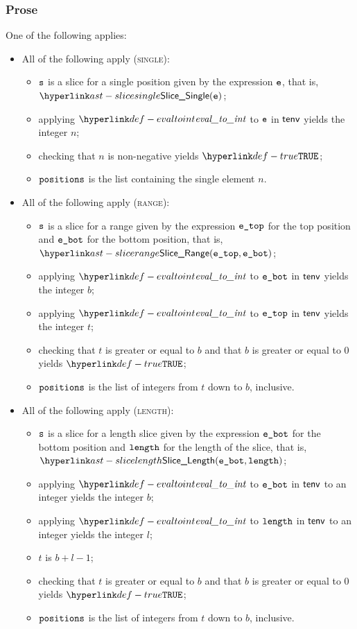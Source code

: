 \subsubsection{Prose}
One of the following applies:
\begin{itemize}
  \item All of the following apply (\textsc{single}):
  \begin{itemize}
    \item $\texttt{s}$ is a slice for a single position given by the expression $\texttt{e}$, that is, \\ $\SliceSingle(\ve)$;
    \item applying $\evaltoint$ to $\texttt{e}$ in $\textsf{tenv}$ yields the integer $n$\ProseOrTypeError;
    \item checking that $n$ is non-negative yields $\True$\ProseOrTypeError;
    \item $\texttt{positions}$ is the list containing the single element $n$.
  \end{itemize}

  \item All of the following apply (\textsc{range}):
  \begin{itemize}
    \item $\texttt{s}$ is a slice for a range given by the expression $\texttt{e\_top}$
          for the top position and $\texttt{e\_bot}$ for the bottom position, that is, \\ $\SliceRange(\etop, \ebot)$;
    \item applying $\evaltoint$ to $\texttt{e\_bot}$ in $\textsf{tenv}$ yields the integer $b$\ProseOrTypeError;
    \item applying $\evaltoint$ to $\texttt{e\_top}$ in $\textsf{tenv}$ yields the integer $t$\ProseOrTypeError;
    \item checking that $t$ is greater or equal to $b$ and that $b$ is greater or equal to $0$ yields $\True$\ProseOrTypeError;
    \item $\texttt{positions}$ is the list of integers from $t$ down to $b$, inclusive.
  \end{itemize}

  \item All of the following apply (\textsc{length}):
  \begin{itemize}
    \item $\texttt{s}$ is a slice for a length slice given by the expression $\texttt{e\_bot}$
          for the bottom position and $\texttt{length}$ for the length of the slice, that is, \\ $\SliceLength(\ebot, \elength)$;
    \item applying $\evaltoint$ to $\texttt{e\_bot}$ in $\textsf{tenv}$ to an integer yields the integer $b$\ProseOrTypeError;
    \item applying $\evaltoint$ to $\texttt{length}$ in $\textsf{tenv}$ to an integer yields the integer $l$\ProseOrTypeError;
    \item $t$ is $b + l - 1$;
    \item checking that $t$ is greater or equal to $b$ and that $b$ is greater or equal to $0$ yields $\True$\ProseOrTypeError;
    \item $\texttt{positions}$ is the list of integers from $t$ down to $b$, inclusive.
  \end{itemize}


\end{itemize}
